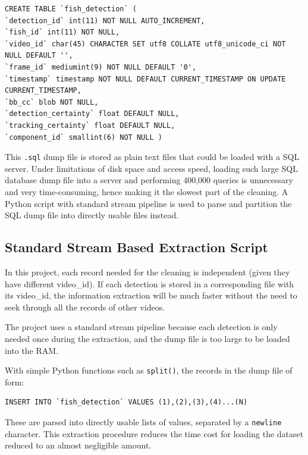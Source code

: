 \documentclass[bsc,frontabs,twoside,fullspacing,parskip,deptreport]{infthesis}
\begin{document}
\lstset{basicstyle=\tiny\ttfamily,breaklines=true,style=sql}
\begin{lstlisting}[frame=single]
CREATE TABLE `fish_detection` (
`detection_id` int(11) NOT NULL AUTO_INCREMENT,
`fish_id` int(11) NOT NULL,
`video_id` char(45) CHARACTER SET utf8 COLLATE utf8_unicode_ci NOT NULL DEFAULT '',
`frame_id` mediumint(9) NOT NULL DEFAULT '0',
`timestamp` timestamp NOT NULL DEFAULT CURRENT_TIMESTAMP ON UPDATE CURRENT_TIMESTAMP,
`bb_cc` blob NOT NULL,
`detection_certainty` float DEFAULT NULL,
`tracking_certainty` float DEFAULT NULL,
`component_id` smallint(6) NOT NULL )
\end{lstlisting}

This {\tt .sql} dump file is stored as plain text files that could be loaded with a SQL server.
Under limitations of disk space and access speed, loading such large SQL database dump file into a server and performing 400,000 queries is unnecessary and very time-consuming, hence making it the slowest part of the cleaning. 
A Python script with standard stream pipeline is used to parse and partition the SQL dump file into directly usable files instead.

\subsection{Standard Stream Based Extraction Script}

In this project, each record needed for the cleaning is independent (given they have different video\_id). 
If each detection is stored in a corresponding file with its video\_id, the information extraction will be much faster without the need to seek through all the records of other videos.

The project uses a standard stream pipeline because each detection is only needed once during the extraction, and the dump file is too large to be loaded into the RAM.

With simple Python functions such as {\tt split()}, the records in the dump file of form:
\lstset{basicstyle=\small\ttfamily,breaklines=true,style=sql}
\begin{lstlisting}[frame=single]
 INSERT INTO `fish_detection` VALUES (1),(2),(3),(4)...(N)
\end{lstlisting}
These are parsed into directly usable lists of values, separated by a {\tt newline} character.
This extraction procedure reduces the time cost for loading the dataset reduced to an almost negligible amount. 
\end{document}
